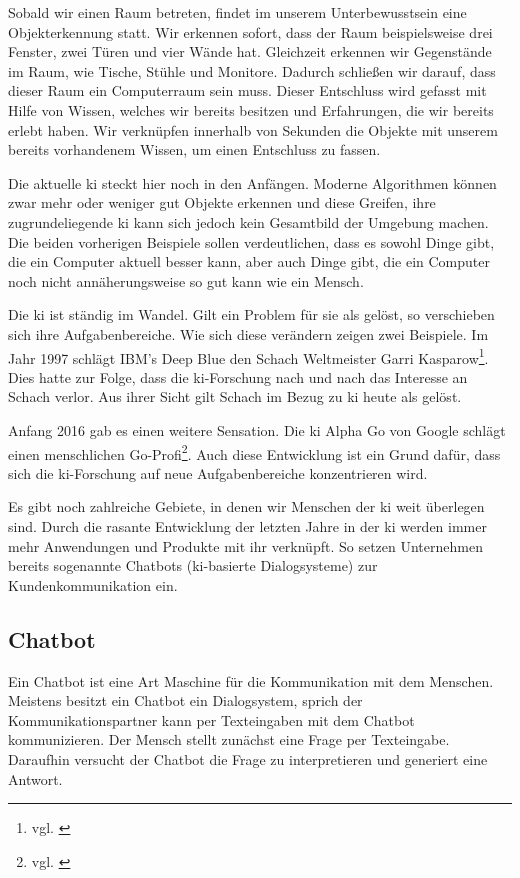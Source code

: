 Sobald wir einen Raum betreten, findet im unserem Unterbewusstsein eine Objekterkennung statt. Wir erkennen sofort, dass der Raum beispielsweise drei Fenster, zwei Türen und vier Wände hat. Gleichzeit erkennen wir Gegenstände im Raum, wie Tische, Stühle und Monitore. Dadurch schließen wir darauf, dass dieser Raum ein Computerraum sein muss. Dieser Entschluss wird gefasst mit Hilfe von Wissen, welches wir bereits besitzen und Erfahrungen, die wir bereits erlebt haben. Wir verknüpfen innerhalb von Sekunden die Objekte mit unserem bereits vorhandenem Wissen, um einen Entschluss zu fassen.

Die aktuelle \ac{ki} steckt hier noch in den Anfängen. 
Moderne Algorithmen können zwar mehr oder weniger gut Objekte erkennen und diese Greifen, ihre zugrundeliegende \ac{ki} kann sich jedoch kein Gesamtbild der Umgebung machen.
Die beiden vorherigen Beispiele sollen verdeutlichen, dass es sowohl Dinge gibt, die ein Computer aktuell besser kann, aber auch Dinge gibt, die ein Computer noch nicht annäherungsweise so gut kann wie ein Mensch.

Die \ac{ki} ist ständig im Wandel. Gilt ein Problem für sie als gelöst, so verschieben sich ihre Aufgabenbereiche.  
Wie sich diese verändern zeigen zwei Beispiele. Im Jahr 1997 schlägt IBM's Deep Blue den Schach Weltmeister Garri Kasparow\footnote{vgl. \cite{SchachQuelle}}. Dies hatte zur Folge, dass die \ac{ki}-Forschung nach und nach das Interesse an Schach verlor. Aus ihrer Sicht gilt Schach im Bezug zu \ac{ki} heute als gelöst.

Anfang 2016 gab es einen weitere Sensation. Die \ac{ki} Alpha Go von Google schlägt einen menschlichen Go-Profi\footnote{vgl. \cite{GoQuelle}}. Auch diese Entwicklung ist ein Grund dafür, dass sich die \ac{ki}-Forschung auf neue Aufgabenbereiche konzentrieren wird. 

Es gibt noch zahlreiche Gebiete, in denen wir Menschen der \ac{ki} weit überlegen sind. Durch die rasante Entwicklung der letzten Jahre in der \ac{ki} werden immer mehr Anwendungen und Produkte mit ihr verknüpft. So setzen Unternehmen bereits sogenannte Chatbots (\ac{ki}-basierte Dialogsysteme) zur Kundenkommunikation ein.

\subsection{Chatbot}
Ein Chatbot ist eine Art Maschine für die Kommunikation mit dem Menschen. Meistens besitzt ein Chatbot ein Dialogsystem, sprich der Kommunikationspartner kann per Texteingaben mit dem Chatbot kommunizieren. 
Der Mensch stellt zunächst eine Frage per Texteingabe. Daraufhin versucht der Chatbot die Frage zu interpretieren und generiert eine Antwort.

